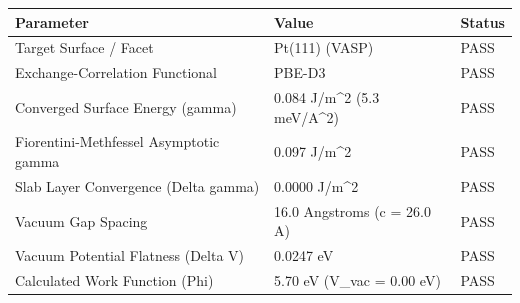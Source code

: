 \begin{tabular}{lll}
\toprule
Parameter & Value & Status \\
\midrule
Target Surface / Facet & Pt(111) (VASP) & PASS \\
Exchange-Correlation Functional & PBE-D3 & PASS \\
Converged Surface Energy (gamma) & 0.084 J/m^2 (5.3 meV/A^2) & PASS \\
Fiorentini-Methfessel Asymptotic gamma & 0.097 J/m^2 & PASS \\
Slab Layer Convergence (Delta gamma) & 0.0000 J/m^2 & PASS \\
Vacuum Gap Spacing & 16.0 Angstroms (c = 26.0 A) & PASS \\
Vacuum Potential Flatness (Delta V) & 0.0247 eV & PASS \\
Calculated Work Function (Phi) & 5.70 eV (V_vac = 0.00 eV) & PASS \\
\bottomrule
\end{tabular}
